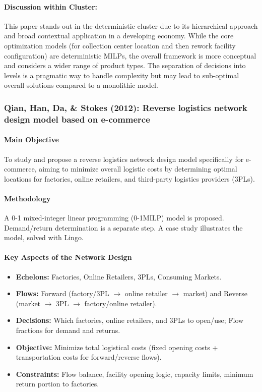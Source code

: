 \paragraph{Discussion within Cluster:} This paper stands out in the deterministic cluster due to its hierarchical approach and broad contextual application in a developing economy. While the core optimization models (for collection center location and then rework facility configuration) are deterministic MILPs, the overall framework is more conceptual and considers a wider range of product types. The separation of decisions into levels is a pragmatic way to handle complexity but may lead to sub-optimal overall solutions compared to a monolithic model.

\subsubsection{Qian, Han, Da, \& Stokes (2012): Reverse logistics network design model based on e-commerce}
\paragraph{Main Objective} To study and propose a reverse logistics network design model specifically for e-commerce, aiming to minimize overall logistic costs by determining optimal locations for factories, online retailers, and third-party logistics providers (3PLs).
\paragraph{Methodology} A 0-1 mixed-integer linear programming (0-1MILP) model is proposed. Demand/return determination is a separate step. A case study illustrates the model, solved with Lingo.
\paragraph{Key Aspects of the Network Design}
\begin{itemize}
    \item \textbf{Echelons:} Factories, Online Retailers, 3PLs, Consuming Markets.
    \item \textbf{Flows:} Forward (factory/3PL $\rightarrow$ online retailer $\rightarrow$ market) and Reverse (market $\rightarrow$ 3PL $\rightarrow$ factory/online retailer).
    \item \textbf{Decisions:} Which factories, online retailers, and 3PLs to open/use; Flow fractions for demand and returns.
    \item \textbf{Objective:} Minimize total logistical costs (fixed opening costs + transportation costs for forward/reverse flows).
    \item \textbf{Constraints:} Flow balance, facility opening logic, capacity limits, minimum return portion to factories.
\end{itemize}
